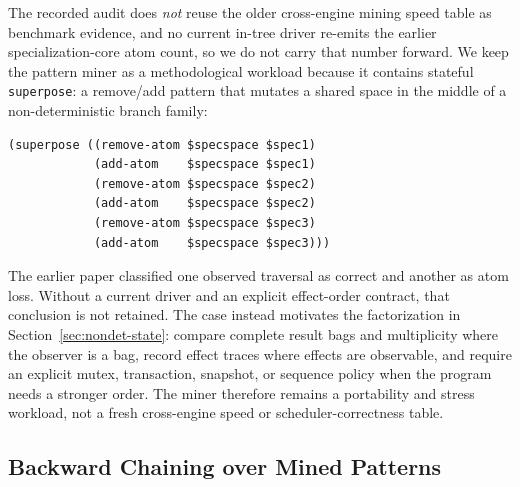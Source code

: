 \documentclass[11pt]{article}
\newcommand{\code}[1]{\texttt{#1}}
\begin{document}
The recorded audit does \emph{not} reuse the older cross-engine mining
speed table as benchmark evidence, and no current in-tree driver
re-emits the earlier specialization-core atom count, so we do not carry
that number forward.  We keep the pattern miner as a methodological
workload because it contains stateful \code{superpose}: a remove/add
pattern that mutates a shared space in the middle of a non-deterministic
branch family:
\begin{lstlisting}[language={},basicstyle=\ttfamily\scriptsize]
(superpose ((remove-atom $specspace $spec1)
            (add-atom    $specspace $spec1)
            (remove-atom $specspace $spec2)
            (add-atom    $specspace $spec2)
            (remove-atom $specspace $spec3)
            (add-atom    $specspace $spec3)))
\end{lstlisting}
The earlier paper classified one observed traversal as correct and another
as atom loss.  Without a current driver and an explicit effect-order
contract, that conclusion is not retained.  The case instead motivates the
factorization in Section~\ref{sec:nondet-state}: compare complete result bags
and multiplicity where the observer is a bag, record effect traces where
effects are observable, and require an explicit mutex, transaction, snapshot,
or sequence policy when the program needs a stronger order.  The miner
therefore remains a portability and stress workload, not a fresh cross-engine
speed or scheduler-correctness table.

\subsection{Backward Chaining over Mined Patterns}
\end{document}
